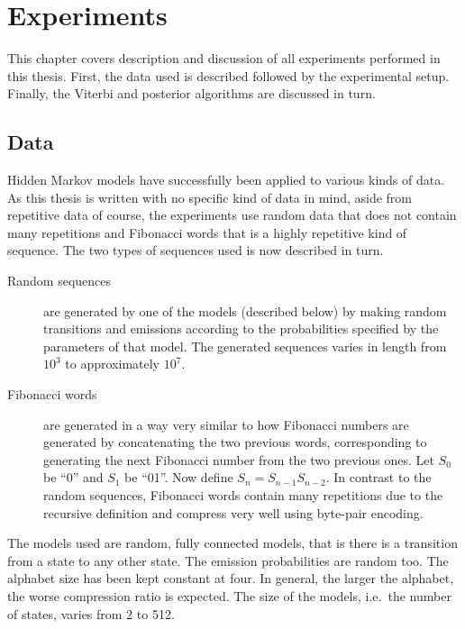\chapter{Experiments}
\label{cha:experiments}

This chapter covers description and discussion of all experiments performed in
this thesis. First, the data used is described followed by the experimental
setup. Finally, the Viterbi and posterior algorithms are discussed in turn.

\section{Data}

Hidden Markov models have successfully been applied to various kinds of
data.  As this thesis is written with no specific kind of data in mind, aside
from repetitive data of course, the experiments use random data that does not
contain many repetitions and Fibonacci words that is a highly repetitive kind
of sequence.  The two types of sequences used is now described in turn.

\begin{description}
\item[Random sequences] are generated by one of the models (described below) by
  making random transitions and emissions according to the probabilities
  specified by the parameters of that model.  The generated sequences varies in
  length from $10^3$ to approximately $10^7$.
\item[Fibonacci words] are generated in a way very similar to how Fibonacci
  numbers are generated by concatenating the two previous words, corresponding
  to generating the next Fibonacci number from the two previous ones. Let $S_0$
  be ``0'' and $S_1$ be ``01''. Now define $S_n=S_{n-1}S_{n-2}$. In contrast to
  the random sequences, Fibonacci words contain many repetitions due to the
  recursive definition and compress very well using byte-pair encoding.
\end{description}

The models used are random, fully connected models, that is there is a
transition from a state to any other state. The emission probabilities are
random too. The alphabet size has been kept constant at four. In general, the
larger the alphabet, the worse compression ratio is expected. The size of the
models, i.e.\ the number of states, varies from 2 to 512.

